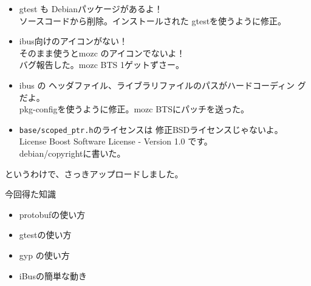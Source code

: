 \begin{frame}
\begin{itemize}

\item gtest も Debianパッケージがあるよ！\\
ソースコードから削除。インストールされた gtestを使うように修正。
\end{itemize}
\end{frame}


\begin{frame}
\begin{itemize}
\item ibus向けのアイコンがない！\\
そのまま使うとmozc のアイコンでないよ！\\
バグ報告した。mozc BTS 1ゲットずさー。
\end{itemize}
\end{frame}


\begin{frame}
 \begin{itemize}
  \item ibus の ヘッダファイル、ライブラリファイルのパスがハードコーディン
	グだよ。\\
	pkg-configを使うように修正。mozc BTSにパッチを送った。
 \end{itemize}
\end{frame}


\begin{frame}
\begin{itemize}
\item \texttt{base/scoped\_ptr.h}のライセンスは 修正BSDライセンスじゃないよ。\\
License\: Boost Software License - Version 1.0 です。\\
debian/copyrightに書いた。
\end{itemize}
\end{frame}

\begin{frame}
というわけで、さっきアップロードしました。
\end{frame}

\begin{frame}
今回得た知識
\begin{itemize}
\item protobufの使い方
\item gtestの使い方 
\item gyp の使い方
\item iBusの簡単な動き
\end{itemize}
\end{frame}

